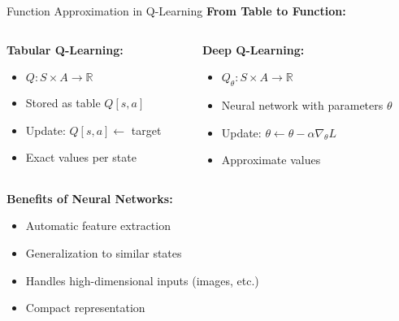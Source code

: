\documentclass[aspectratio=169,10pt]{beamer}
\begin{document}
\begin{frame}{Function Approximation in Q-Learning}
\textbf{From Table to Function:}
\begin{columns}[T]
\begin{column}{0.5\textwidth}
\textbf{Tabular Q-Learning:}
\begin{itemize}
    \item $Q: S \times A \rightarrow \mathbb{R}$
    \item Stored as table $Q[s,a]$
    \item Update: $Q[s,a] \leftarrow$ target
    \item Exact values per state
\end{itemize}
\end{column}
\begin{column}{0.5\textwidth}
\textbf{Deep Q-Learning:}
\begin{itemize}
    \item $Q_\theta: S \times A \rightarrow \mathbb{R}$
    \item Neural network with parameters $\theta$
    \item Update: $\theta \leftarrow \theta - \alpha \nabla_\theta L$
    \item Approximate values
\end{itemize}
\end{column}
\end{columns}

\vspace{0.5cm}
\textbf{Benefits of Neural Networks:}
\begin{itemize}
    \item Automatic feature extraction
    \item Generalization to similar states
    \item Handles high-dimensional inputs (images, etc.)
    \item Compact representation
\end{itemize}
\end{frame}
\end{document}
